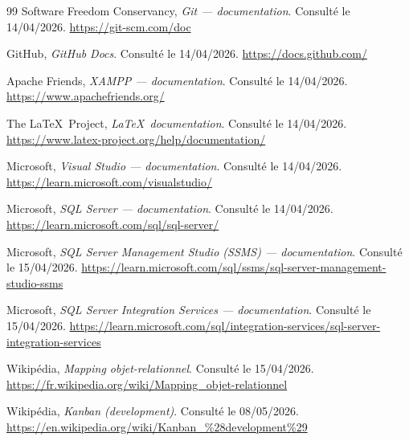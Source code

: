 \begin{thebibliography}{99}
Software Freedom Conservancy, \textit{Git — documentation}. Consulté le 14/04/2026. \url{https://git-scm.com/doc}

GitHub, \textit{GitHub Docs}. Consulté le 14/04/2026. \url{https://docs.github.com/}

Apache Friends, \textit{XAMPP — documentation}. Consulté le 14/04/2026. \url{https://www.apachefriends.org/}

The \LaTeX\ Project, \textit{\LaTeX\ documentation}. Consulté le 14/04/2026. \url{https://www.latex-project.org/help/documentation/}

Microsoft, \textit{Visual Studio — documentation}. Consulté le 14/04/2026. \url{https://learn.microsoft.com/visualstudio/}

Microsoft, \textit{SQL Server — documentation}. Consulté le 14/04/2026. \url{https://learn.microsoft.com/sql/sql-server/}

Microsoft, \textit{SQL Server Management Studio (SSMS) — documentation}. Consulté le 15/04/2026. \url{https://learn.microsoft.com/sql/ssms/sql-server-management-studio-ssms}

Microsoft, \textit{SQL Server Integration Services — documentation}. Consulté le 15/04/2026. \url{https://learn.microsoft.com/sql/integration-services/sql-server-integration-services}

Wikipédia, \textit{Mapping objet-relationnel}. Consulté le 15/04/2026. \url{https://fr.wikipedia.org/wiki/Mapping_objet-relationnel}

Wikipédia, \textit{Kanban (development)}. Consulté le 08/05/2026. \url{https://en.wikipedia.org/wiki/Kanban_%28development%29}

\end{thebibliography}

